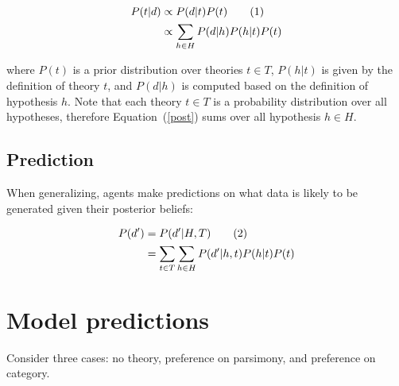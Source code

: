 \documentclass{article}
\newcommand\numberthis{\addtocounter{equation}{1}\tag{\theequation}}
\begin{document}
	\vspace*{-2em}
	\begin{align*} \label{post}
		P(t|d) &\propto P(d|t) P(t) \numberthis \\
			   &\propto \sum_{h \in H} P(d|h) P(h|t) P(t)
	\end{align*}

where 
%
	$P(t)$ is a prior distribution over theories $t \in T$, 
	$P(h|t)$ is given by the definition of theory $t$, 
	and $P(d|h)$ is computed based on the definition of hypothesis $h$. 
%
Note that each theory $t \in T$ is a probability distribution over all hypotheses, therefore Equation~(\ref{post}) sums over all hypothesis $h \in H$.


\subsection*{Prediction}

When generalizing, agents make predictions on what data is likely to be generated given their posterior beliefs:

	\vspace*{-2em}
	\begin{align*} \label{pred}
		P(d') &= P(d'|H,T) \numberthis \\
			  &= \sum_{t \in T} \sum_{h \in H} P(d'|h, t) P(h|t) P(t)
	\end{align*}


\section{Model predictions}

Consider three cases: no theory, preference on parsimony, and preference on category.
\end{document}
